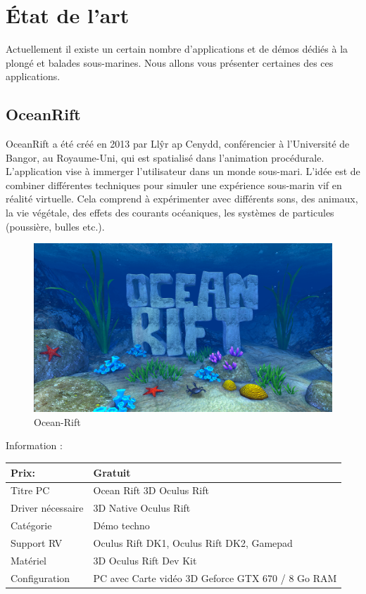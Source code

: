 \chapter{État de l’art}

Actuellement il existe un certain nombre d’applications et de démos dédiés à la plongé et  balades sous-marines. Nous allons vous présenter certaines des ces applications.  

\section{OceanRift}

OceanRift a été créé en 2013 par Llŷr ap Cenydd, conférencier à l’Université de Bangor, au Royaume-Uni, qui est spatialisé dans l’animation procédurale.
L’application vise à immerger l'utilisateur dans un monde sous-mari. L'idée est de combiner différentes techniques pour simuler une expérience sous-marin vif en réalité virtuelle. Cela comprend à expérimenter avec différents sons, des animaux, la vie végétale, des effets des courants océaniques, les systèmes de particules (poussière, bulles etc.).


\begin{figure}[!ht]
	\center	
	\includegraphics[scale=0.4]{image/OceanRift.png}
	\caption{Ocean-Rift}
\end{figure}

Information \cite{2} \cite{3}:
\begin{table}[h]
	\center	
\begin{tabular}{|l|l|}
\hline
 Prix:  & Gratuit \\ \hline
 Titre PC  &  Ocean Rift 3D Oculus Rift \\ \hline
 Driver nécessaire  &  3D Native Oculus Rift \\ \hline
 Catégorie  &  Démo techno \\ \hline
 Support RV  &  Oculus Rift DK1, Oculus Rift DK2, Gamepad\\ \hline
 Matériel  &  3D Oculus Rift Dev Kit \\ \hline
 Configuration  &  PC avec Carte vidéo 3D Geforce GTX 670 / 8 Go RAM  \\ \hline
\end{tabular}
\end{table}

